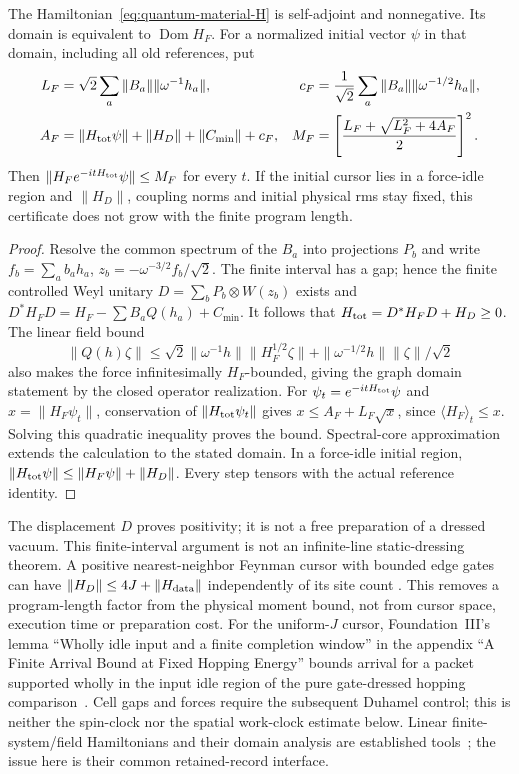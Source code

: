 \begin{proposition}
\label{prop:quantum-material-positive}
The Hamiltonian~\eqref{eq:quantum-material-H} is self-adjoint and
nonnegative. Its domain is equivalent to $\operatorname{Dom}H_F$.
For a normalized initial vector $\psi$ in that domain, including all
old references, put
\begin{align*}
 L_F&=\sqrt2\sum_a\|B_a\|\|\omega^{-1}h_a\|,&
 c_F&=\frac1{\sqrt2}\sum_a\|B_a\|\|\omega^{-1/2}h_a\|,\\
 A_F&=\|H_{\rm tot}\psi\|+\|H_D\|+\|C_{\min}\|+c_F,&
 M_F&=\left[\frac{L_F+\sqrt{L_F^2+4A_F}}2\right]^2 .
\end{align*}
Then $\|H_F e^{-itH_{\rm tot}}\psi\|\le M_F$ for every $t$.
If the initial cursor lies in a force-idle region and $\|H_D\|$,
coupling norms and initial physical rms stay fixed, this certificate
does not grow with the finite program length.
\end{proposition}
\begin{proof}
Resolve the common spectrum of the $B_a$ into projections $P_b$ and
write $f_b=\sum_a b_a h_a$,
$z_b=-\omega^{-3/2}f_b/\sqrt2$.
The finite interval has a gap; hence the finite controlled Weyl unitary
$D=\sum_bP_b\otimes W(z_b)$ exists and
$D^*H_FD=H_F-\sum B_aQ(h_a)+C_{\min}$.
It follows that $H_{\rm tot}=D^*H_FD+H_D\ge0$.
The linear field bound
\[
 \|Q(h)\zeta\|\le
 \sqrt2\|\omega^{-1}h\|\|H_F^{1/2}\zeta\|
 +\|\omega^{-1/2}h\|\|\zeta\|/\sqrt2
\]
also makes the force infinitesimally $H_F$-bounded, giving the graph
domain statement by the closed operator realization.
For $\psi_t=e^{-itH_{\rm tot}}\psi$ and $x=\|H_F\psi_t\|$,
conservation of $\|H_{\rm tot}\psi_t\|$ gives
$x\le A_F+L_F\sqrt x$, since
$\langle H_F\rangle_t\le x$. Solving this quadratic inequality proves
the bound. Spectral-core approximation extends the calculation to the
stated domain. In a force-idle initial region,
$\|H_{\rm tot}\psi\|\le\|H_F\psi\|+\|H_D\|$.
Every step tensors with the actual reference identity.
\end{proof}

The displacement $D$ proves positivity; it is not a free preparation
of a dressed vacuum. This finite-interval argument is not an
infinite-line static-dressing theorem. A positive nearest-neighbor
Feynman cursor with bounded edge gates can have
$\|H_D\|\le4J+\|H_{\rm data}\|$ independently of its site count
\cite{CahaLandauNagaj2018}. This removes a program-length factor from
the physical moment bound, not from cursor space, execution time or
preparation cost. For the uniform-$J$ cursor, Foundation~III's lemma
``Wholly idle input and a finite completion window'' in the appendix
``A Finite Arrival Bound at Fixed Hopping Energy'' bounds arrival for
a packet supported wholly in the input idle region of the pure
gate-dressed hopping comparison~\cite{FoundationIII}. Cell gaps and
forces require the subsequent Duhamel control; this is neither the
spin-clock nor the spatial work-clock estimate below.
Linear finite-system/field Hamiltonians and their
domain analysis are established tools~\cite{HubnerSpohn1995};
the issue here is their common retained-record interface.


